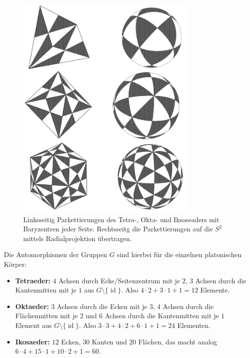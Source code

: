 \documentclass[12pt,a4paper]{article}
\theoremstyle{plain}
\numberwithin{equation}{section}
\begin{document}
\begin{figure}[h]
\includegraphics[width=0.8\textwidth]{polyeder.png}
\caption{Linksseitig Parkettierungen des Tetra-, Okta- und Iksoseaders mit Baryzentren jeder Seite. Rechtsseitg die Parkettierungen auf die $S^2$ mittels Radialprojektion übertragen.}
\end{figure}

\noindent Die Automorphismen der Gruppen $G$ sind hierbei für die einzelnen platonischen Körper:
\begin{itemize}
\item \textbf{Tetraeder:} $4$ Achsen durch Ecke/Seitenzentrum mit je $2$, $3$ Achsen durch die Kantenmitten mit je $1$ aus $G\setminus\{\operatorname{id}\}$. Also $4\cdot 2 + 3\cdot 1 + 1 = 12$ Elemente.
\item \textbf{Oktaeder:} $3$ Achsen durch die Ecken mit je $3$, $4$ Achsen durch die Flächenmitten mit je $2$ und $6$ Achsen durch die Kantenmitten mit je $1$ Element aus $G\setminus\{\operatorname{id}\}$. Also $3\cdot 3 + 4\cdot 2 + 6\cdot 1 + 1 = 24$ Elementen.
\item \textbf{Ikosaeder:} $12$ Ecken, $30$ Kanten und $20$ Flächen, das macht analog $6\cdot 4 + 15\cdot 1 + 10\cdot 2 + 1 = 60$.
\end{itemize}
\end{document}
